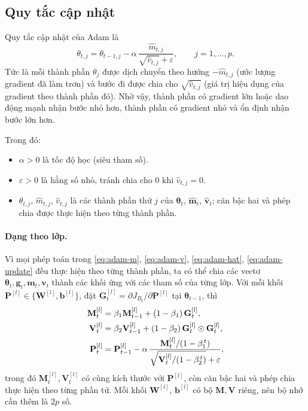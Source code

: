 \subsection{Quy tắc cập nhật}

Quy tắc cập nhật của Adam là
\begin{equation}\label{eq:adam-update}
  \theta_{t,j}=\theta_{t-1,j}-\alpha\,\frac{\hat m_{t,j}}{\sqrt{\hat v_{t,j}}+\varepsilon},
  \qquad j=1,\dots,p .
\end{equation}
Tức là mỗi thành phần $\theta_j$ được dịch chuyển theo hướng $-\hat m_{t,j}$ (ước lượng gradient đã làm trơn) và bước đi được chia cho $\sqrt{\hat v_{t,j}}$ (giá trị hiệu dụng của gradient theo thành phần đó). Nhờ vậy, thành phần có gradient lớn hoặc dao động mạnh nhận bước nhỏ hơn, thành phần có gradient nhỏ và ổn định nhận bước lớn hơn.

Trong đó:
\begin{itemize}
  \item $\alpha>0$ là tốc độ học (siêu tham số).
  \item $\varepsilon>0$ là hằng số nhỏ, tránh chia cho $0$ khi $\hat v_{t,j}=0$.
  \item $\theta_{t,j}$, $\hat m_{t,j}$, $\hat v_{t,j}$ là các thành phần thứ $j$ của $\boldsymbol{\theta}_t$, $\hat{\mathbf{m}}_t$, $\hat{\mathbf{v}}_t$; căn bậc hai và phép chia được thực hiện theo từng thành phần.
\end{itemize}

\paragraph{Dạng theo lớp.}
Vì mọi phép toán trong \eqref{eq:adam-m}, \eqref{eq:adam-v}, \eqref{eq:adam-hat}, \eqref{eq:adam-update} đều thực hiện theo từng thành phần, ta có thể chia các vectơ $\boldsymbol{\theta}_t,\mathbf{g}_t,\mathbf{m}_t,\mathbf{v}_t$ thành các khối ứng với các tham số của từng lớp. Với mỗi khối $\mathbf{P}^{[l]}\in\{\mathbf{W}^{[l]},\mathbf{b}^{[l]}\}$, đặt $\mathbf{G}^{[l]}_t=\partial J_{B_t}/\partial\mathbf{P}^{[l]}$ tại $\boldsymbol{\theta}_{t-1}$, thì
\begin{align}
  \mathbf{M}^{[l]}_t&=\beta_1\mathbf{M}^{[l]}_{t-1}+(1-\beta_1)\,\mathbf{G}^{[l]}_t,\notag\\
  \mathbf{V}^{[l]}_t&=\beta_2\mathbf{V}^{[l]}_{t-1}+(1-\beta_2)\,\mathbf{G}^{[l]}_t\odot\mathbf{G}^{[l]}_t,\notag\\
  \mathbf{P}^{[l]}_t&=\mathbf{P}^{[l]}_{t-1}-\alpha\,\frac{\mathbf{M}^{[l]}_t/(1-\beta_1^{\,t})}{\sqrt{\mathbf{V}^{[l]}_t/(1-\beta_2^{\,t})}+\varepsilon},\notag
\end{align}
trong đó $\mathbf{M}^{[l]}_t,\mathbf{V}^{[l]}_t$ có cùng kích thước với $\mathbf{P}^{[l]}$, còn căn bậc hai và phép chia thực hiện theo từng phần tử. Mỗi khối $\mathbf{W}^{[l]}$, $\mathbf{b}^{[l]}$ có bộ $\mathbf{M},\mathbf{V}$ riêng, nên bộ nhớ cần thêm là $2p$ số.

